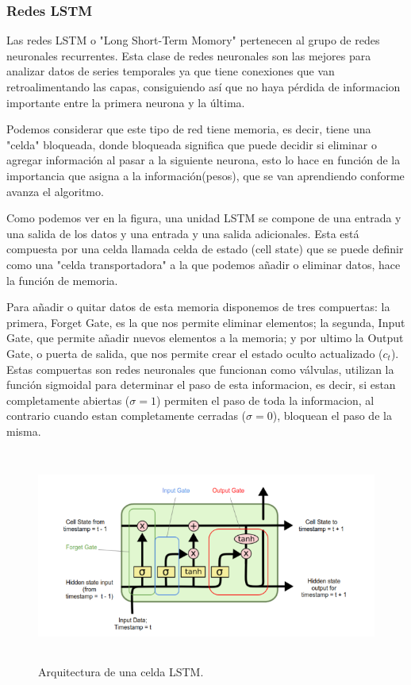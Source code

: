 \documentclass[11pt]{article} %
\begin{document}
\subsubsection{Redes LSTM}

Las redes LSTM o "Long Short-Term Momory" pertenecen al grupo de redes neuronales recurrentes. Esta clase de redes neuronales son las mejores para analizar datos de series temporales ya que tiene conexiones que van retroalimentando las capas, consiguiendo así que no haya pérdida de informacion importante entre la primera neurona y la última.

Podemos considerar que este tipo de red tiene memoria, es decir, tiene una "celda" bloqueada, donde bloqueada significa que puede decidir si eliminar o agregar información al pasar a la siguiente neurona, esto lo hace en función de la importancia que asigna a la información(pesos), que se van aprendiendo conforme avanza el algoritmo.


Como podemos ver en la figura, una unidad LSTM se compone de una entrada y una salida de los datos y una entrada y una salida adicionales. Esta está compuesta por una celda llamada celda de estado (cell state) que se puede definir como una "celda transportadora" a la que podemos añadir o eliminar datos, hace la función de memoria.

Para añadir o quitar datos de esta memoria disponemos de tres compuertas:
la primera, Forget Gate, es la que nos permite eliminar elementos; la segunda, Input Gate, que permite añadir nuevos elementos a la memoria; y por ultimo la Output Gate, o puerta de salida, que nos permite crear el estado oculto actualizado ($c_t$). Estas compuertas son redes neuronales que funcionan como válvulas, utilizan la función sigmoidal para determinar el paso de esta informacion, es decir, si estan completamente abiertas ($\sigma = 1$) permiten el paso de toda la informacion, al contrario cuando estan completamente cerradas ($\sigma = 0$), bloquean el paso de la misma.


\begin{figure}[h!]
	\centering
	\includegraphics[width=12cm, height=7cm]{imlstm.png}
	\caption{Arquitectura de una celda LSTM.}
\end{figure}
\end{document}
